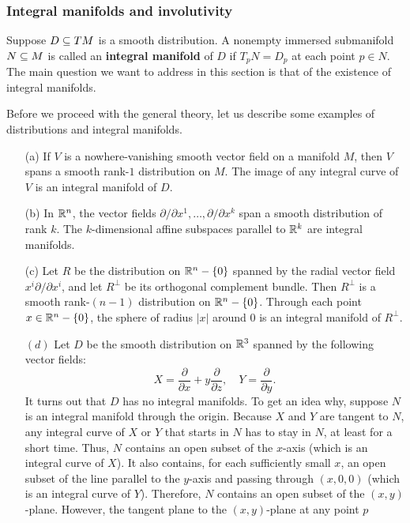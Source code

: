 \subsubsection{Integral manifolds and involutivity}
Suppose $D\subseteq TM$ is a smooth distribution. A nonempty immersed submanifold $N\subseteq M$ is called an \textbf{integral manifold} of $D$ if $T_pN=D_p$ at each point $p\in N$. The main question we want to address in this section is that of the existence of
integral manifolds.\par 
Before we proceed with the general theory, let us describe some examples of
distributions and integral manifolds.
\begin{example}\label{distribution eg}
\mbox{}
\begin{itemize}
\item[(a)] If $V$ is a nowhere-vanishing smooth vector field on a manifold $M$, then $V$ spans a smooth rank-$1$ distribution on $M$. The image of any integral curve of $V$ is an integral manifold of $D$.
\item[(b)] In $\mathbb{R}^n$, the vector fields $\partial/\partial x^1,\dots,\partial/\partial x^k$ span a smooth distribution of rank $k$. The $k$-dimensional affine subspaces parallel to $\mathbb{R}^k$ are integral manifolds.
\item[(c)] Let $R$ be the distribution on $\mathbb{R}^n-\{0\}$ spanned by the radial vector field $x^i\partial/\partial x^i$, and let $R^{\bot}$ be its orthogonal complement bundle. Then $R^\bot$ is a smooth rank-$(n-1)$ distribution on $\mathbb{R}^n-\{0\}$. Through each point $x\in\mathbb{R}^n-\{0\}$, the sphere of radius $|x|$ around $0$ is an integral manifold of $R^{\bot}$.
\item[$(d)$] Let $D$ be the smooth distribution on $\mathbb{R}^3$ spanned by the following vector fields:
\[X=\frac{\partial}{\partial x}+y\frac{\partial}{\partial z},\quad Y=\frac{\partial}{\partial y}.\]
It turns out that $D$ has no integral manifolds. To get an idea why, suppose $N$ is an integral manifold through the origin. Because $X$ and $Y$ are tangent to $N$, 
any integral curve of $X$ or $Y$ that starts in $N$ has to stay in $N$, at least for a short time. Thus, $N$ contains an open subset of the $x$-axis (which 
is an integral curve of $X$). It also contains, for each sufficiently small $x$, an open subset of the line parallel to the $y$-axis and passing through $(x,0,0)$ 
(which is an integral curve of $Y$). Therefore, $N$ contains an open subset of the $(x,y)$-plane. However, the tangent plane to the $(x,y)$-plane at any point $p$ 

\end{itemize}
\end{example}
